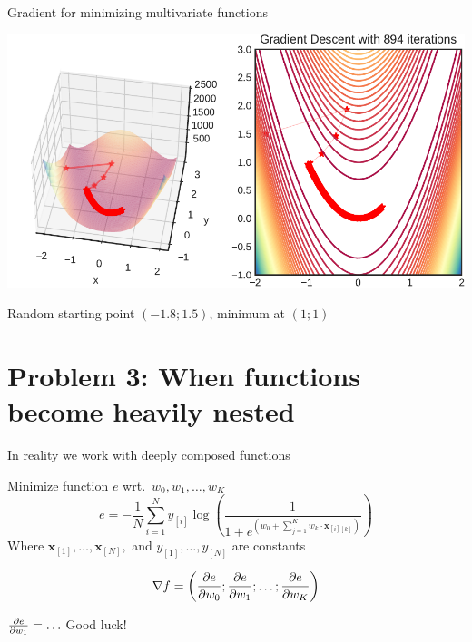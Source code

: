 \documentclass[12pt,aspectratio=169]{beamer}
\begin{document}
\begin{frame}{Gradient for minimizing multivariate functions}

\includegraphics[width=0.99\linewidth]{img/gradient1.pdf}
	

Random starting point $(-1.8; 1.5)$, minimum at $(1; 1)$

\end{frame}

\section{Problem 3: When functions become heavily nested}


\begin{frame}{In reality we work with deeply composed functions}

\begin{example}
Minimize function $e$ wrt.\ $w_0, w_1, \ldots, w_K$
$$
e = - \frac{1}{N} \sum_{i = 1}^{N} y_{[i]} \log
\left(
\frac{1}{1 +
	e^{\left( w_0 + \sum_{j=1}^{K} w_k \cdot \bm{x}_{[i][k]} \right)}
}
\right)
$$
Where $\bm{x}_{[1]}, \ldots, \bm{x}_{[N]},$ and $y_{[1]}, \ldots, y_{[N]}$ are constants
\end{example}

\pause

$$
\nabla f = \left( \pdv{e}{w_0}; \pdv{e}{w_1}; \ldots; \pdv{e}{w_K} \right)
$$

$\pdv{e}{w_1} = \ldots$ \pause Good luck!
	
\end{frame}
\end{document}
